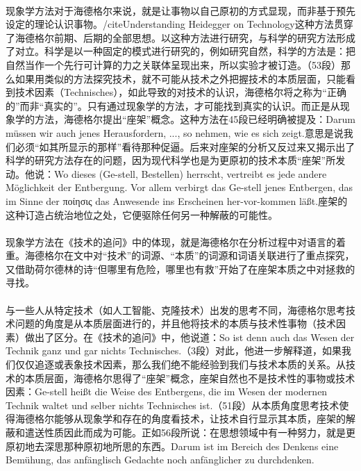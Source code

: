 \documentclass{article}
\begin{document}
		\paragraph{}
		现象学方法对于海德格尔来说，就是让事物以自己原初的方式显现，而非基于预先设定的理论认识事物。/cite{Understanding Heidegger on Technology}这种方法贯穿了海德格尔前期、后期的全部思想。以这种方法进行研究，与科学的研究方法形成了对立。科学是以一种固定的模式进行研究的，例如研究自然，科学的方法是：把自然当作一个先行可计算的力之关联体呈现出来，所以实验才被订造。（53段）那么如果用类似的方法探究技术，就不可能从技术之外把握技术的本质层面，只能看到技术因素（Technisches），如此导致的对技术的认识，海德格尔将之称为“正确的”而非“真实的”。只有通过现象学的方法，才可能找到真实的认识。而正是从现象学的方法，海德格尔提出“座架”概念。这种方法在45段已经明确被提及：Darum müssen wir auch jenes Herausfordern, ..., so nehmen, wie es sich zeigt.意思是说我们必须“如其所显示的那样”看待那种促逼。后来对座架的分析又反过来又揭示出了科学的研究方法存在的问题，因为现代科学也是为更原初的技术本质“座架”所发动。他说：Wo dieses (Ge-stell, Bestellen) herrscht, vertreibt es jede andere Möglichkeit der Entbergung. Vor allem verbirgt das Ge-stell jenes Entbergen, das im Sinne der ποίησις das Anwesende ins Erscheinen her-vor-kommen läßt.座架的这种订造占统治地位之处，它便驱除任何另一种解蔽的可能性。
		\paragraph{}
		现象学方法在《技术的追问》中的体现，就是海德格尔在分析过程中对语言的着重。海德格尔在文中对“技术”的词源、“本质”的词源和词语关联进行了重点探究，又借助荷尔德林的诗“但哪里有危险，哪里也有救”开始了在座架本质之中对拯救的寻找。
		\paragraph{}
与一些人从特定技术（如人工智能、克隆技术）出发的思考不同，海德格尔思考技术问题的角度是从本质层面进行的，并且他将技术的本质与技术性事物（技术因素）做出了区分。在《技术的追问》中，他说道：So ist denn auch das Wesen der Technik ganz und gar nichts Technisches.（3段）对此，他进一步解释道，如果我们仅仅追逐或表象技术因素，那么我们绝不能经验到我们与技术本质的关系。从技术的本质层面，海德格尔思得了“座架”概念，座架自然也不是技术性的事物或技术因素：Ge-stell heißt die Weise des Entbergens, die im Wesen der modernen Technik waltet und selber nichts Technisches ist.（51段）从本质角度思考技术使得海德格尔能够从现象学和存在的角度看技术，让技术自行显示其本质，座架的解蔽和遣送性质因此而成为可能。正如56段所说：在思想领域中有一种努力，就是更原初地去深思那种原初地所思的东西。Darum ist im Bereich des Denkens eine Bemühung, das anfänglisch Gedachte noch anfänglicher zu durchdenken.
\end{document}
